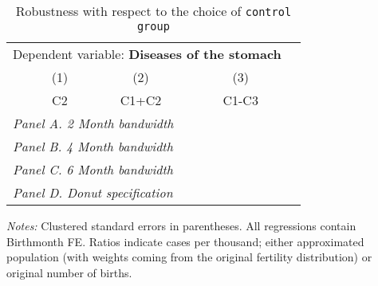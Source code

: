  \begin{table}[H] \begin{threeparttable} \centering \caption{Robustness with respect to the choice of \texttt{control group}} {\def\sym#1{\ifmmode^{#1}\else\(^{#1}\)\fi} \begin{tabular}{l*{4}{c}} \toprule \multicolumn{4}{c}{Dependent variable: \textbf{Diseases of the stomach}} \\ \cmidrule(lr){2-4}
            &\multicolumn{1}{c}{(1)}&\multicolumn{1}{c}{(2)}&\multicolumn{1}{c}{(3)}\\
            &\multicolumn{1}{c}{C2}&\multicolumn{1}{c}{C1+C2}&\multicolumn{1}{c}{C1-C3}\\
\midrule
 \multicolumn{4}{l}{\emph{Panel A. 2 Month bandwidth}} \\    \midrule\multicolumn{4}{l}{\emph{Panel B. 4 Month bandwidth}} \\    \midrule\multicolumn{4}{l}{\emph{Panel C. 6 Month bandwidth}} \\    \midrule\multicolumn{4}{l}{\emph{Panel D. Donut specification}} \\    
\bottomrule \end{tabular} } \begin{tablenotes} \item \scriptsize \emph{Notes:} Clustered standard errors in parentheses. All regressions contain Birthmonth FE. Ratios indicate cases per thousand; either approximated population (with weights coming from the original fertility distribution) or original number of births. \end{tablenotes} \end{threeparttable} \end{table} 
